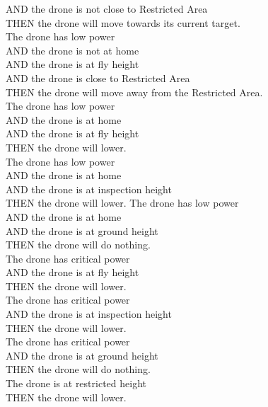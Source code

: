 \documentclass{article}
\begin{document}
\indent AND the drone is not close to Restricted Area\\
\indent THEN the drone will move towards its current target.
\newline\\
The drone has low power\\
\indent AND the drone is not at home\\
\indent AND the drone is at fly height\\
\indent AND the drone is close to Restricted Area\\
\indent THEN the drone will move away from the Restricted Area.
\newline\\
The drone has low power\\
\indent AND the drone is at home\\
\indent AND the drone is at fly height\\
\indent THEN the drone will lower.
\newline\\
The drone has low power\\
\indent AND the drone is at home\\
\indent AND the drone is at inspection height\\
\indent THEN the drone will lower.
\newpage
\noindent
The drone has low power\\
\indent AND the drone is at home\\
\indent AND the drone is at ground height\\
\indent THEN the drone will do nothing.
\newline\\
The drone has critical power\\
\indent AND the drone is at fly height\\
\indent THEN the drone will lower.
\newline\\
The drone has critical power\\
\indent AND the drone is at inspection height\\
\indent THEN the drone will lower.
\newline\\
The drone has critical power\\
\indent AND the drone is at ground height\\
\indent THEN the drone will do nothing.
\newline\\
The drone is at restricted height\\
\indent THEN the drone will lower.
\end{document}
